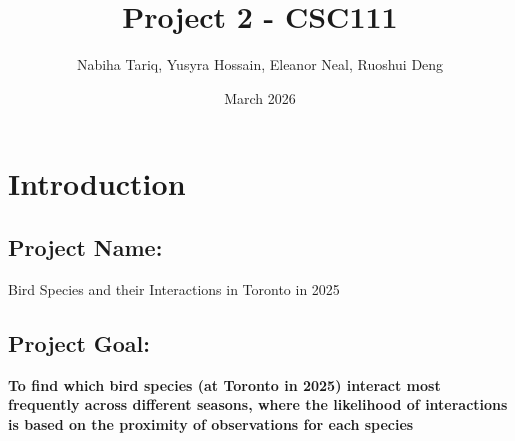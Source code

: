 \documentclass{article}
\title{Project 2 - CSC111}
\author{Nabiha Tariq, Yusyra Hossain, Eleanor Neal, Ruoshui Deng}
\date{March 2026}
\begin{document}
\maketitle

\section{Introduction}
 
\subsection*{Project Name:}
Bird Species and their Interactions in Toronto in 2025

\subsection*{Project Goal:} 
\textbf{To find which bird species (at Toronto in 2025) interact most frequently across different seasons, where the likelihood of interactions is based on the proximity of observations for each species}
\end{document}

